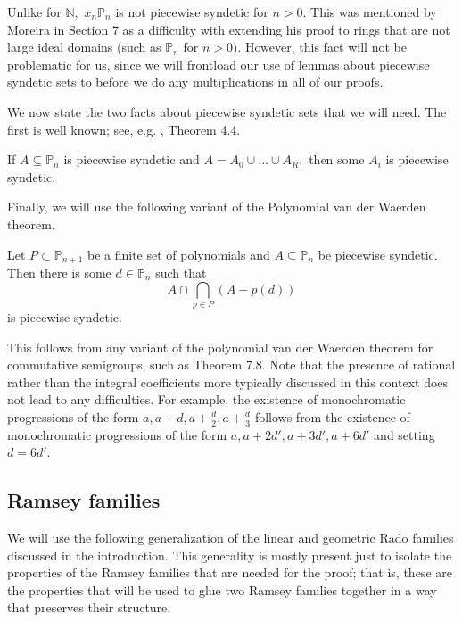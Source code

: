 \documentclass[tocmacros]{daj}
\begin{document}
Unlike for $\mathbb{N},$ $x_{n}\mathbb{P}_n$ is not piecewise syndetic for $n>0.$  This was mentioned by Moreira in \cite{moreira2017monochromatic} Section 7 as a difficulty with extending his proof to rings that are not large ideal domains (such as $\mathbb{P}_n$ for $n>0)$.  However, this fact will not be problematic for us, since we will frontload our use of lemmas about piecewise syndetic sets to before we do any multiplications in all of our proofs.

We now state the two facts about piecewise syndetic sets that we will need.  The first is well known; see, e.g. \cite{hindman2011algebra}, Theorem 4.4.

\begin{lemma}\label{lemma tech}
If $A\subseteq \mathbb{P}_n$ is piecewise syndetic and $A=A_0\cup...\cup A_R,$ then some $A_i$ is piecewise syndetic.
\end{lemma}

Finally, we will use the following variant of the Polynomial van der Waerden theorem.

\begin{theorem}\label{pvd}
Let $P\subset \mathbb{P}_{n+1}$ be a finite set of polynomials and $A\subseteq\mathbb{P}_n$ be piecewise syndetic.  Then there is some $d\in\mathbb{P}_n$ such that $$A\cap \bigcap_{p\in P}(A-p(d))$$ is piecewise syndetic.

\end{theorem}

This follows from any variant of the polynomial van der Waerden theorem for commutative semigroups, such as \cite{bergelson2016interplay} Theorem 7.8.  Note that the presence of rational rather than the integral coefficients more typically discussed in this context does not lead to any difficulties.  For example, the existence of monochromatic progressions of the form $a,a+d, a+\frac{d}{2}, a+\frac{d}{3}$ follows from the existence of monochromatic progressions of the form $a, a+2d', a+3d', a+6d'$ and setting $d=6d'.$


\subsection{Ramsey families}\label{subs family}

We will use the following generalization of the linear and geometric Rado families discussed in the introduction.  This generality is mostly present just to isolate the properties of the Ramsey families that are needed for the proof; that is, these are the properties that will be used to glue two Ramsey families together in a way that preserves their structure.
\end{document}
